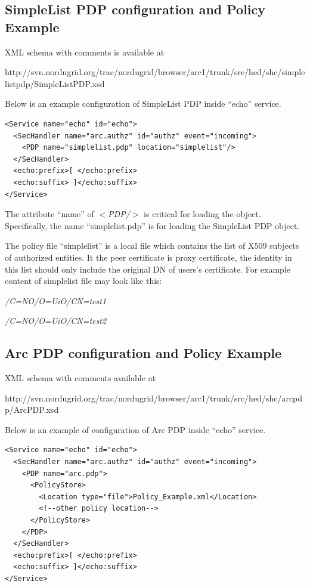 \documentclass{article}                            %
\begin{document}
\subsection{SimpleList PDP configuration and Policy Example} %
\label{subsec:simplepdp_conf}
XML schema with comments is available at

http://svn.nordugrid.org/trac/nordugrid/browser/arc1/trunk/src/hed/shc/simplelistpdp/SimpleListPDP.xsd

Below is an example configuration of SimpleList PDP inside ``echo'' service.

\begin{verbatim}
<Service name="echo" id="echo">
  <SecHandler name="arc.authz" id="authz" event="incoming">
    <PDP name="simplelist.pdp" location="simplelist"/>
  </SecHandler>
  <echo:prefix>[ </echo:prefix>
  <echo:suffix> ]</echo:suffix>
</Service>
\end{verbatim}

The attribute ``name'' of \textit{$<$PDP/$>$} is critical for loading the object. Specifically, the name ``simplelist.pdp'' is for loading the SimpleList PDP object.

The policy file ``simplelist'' is a local file which contains the list of X509 subjects of authorized entities. It the peer certificate is proxy certificate, the identity in this list should only include the original DN of users's certificate.
For example content of simplelist file may look like this:

\emph{/C=NO/O=UiO/CN=test1}

\emph{/C=NO/O=UiO/CN=test2}



\subsection{Arc PDP configuration and Policy Example} %
\label{subsec:arcpdp_conf}
XML schema with comments available at

http://svn.nordugrid.org/trac/nordugrid/browser/arc1/trunk/src/hed/shc/arcpdp/ArcPDP.xsd

Below is an example of configuration of Arc PDP inside ``echo'' service.
\begin{verbatim}
<Service name="echo" id="echo">
  <SecHandler name="arc.authz" id="authz" event="incoming">
    <PDP name="arc.pdp">
      <PolicyStore>
        <Location type="file">Policy_Example.xml</Location>
        <!--other policy location-->
      </PolicyStore>
    </PDP>
  </SecHandler>
  <echo:prefix>[ </echo:prefix>
  <echo:suffix> ]</echo:suffix>
</Service>
\end{verbatim}
\end{document}
